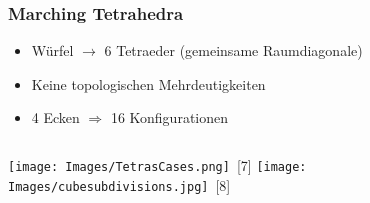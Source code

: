 \documentclass{beamer}
\begin{document}
\begin{frame}[t]
  \frametitle{Marching Tetrahedra}

  \begin{itemize}
    \item Würfel $\rightarrow$ 6 Tetraeder (gemeinsame Raumdiagonale)
    \item Keine topologischen Mehrdeutigkeiten
    \item 4 Ecken $\Rightarrow$ 16 Konfigurationen
  \end{itemize}

  \vspace{1ex}

  \hfill %
  \begin{minipage}{0.9\textwidth}
    \begin{columns}[onlytextwidth]
        \texttt{[image: Images/TetrasCases.png]}~\scriptsize[7]
      \raggedleft
        \texttt{[image: Images/cubesubdivisions.jpg]}~\scriptsize[8]
    \end{columns}
  \end{minipage}
\end{frame}

\begin{comment}
\begin{frame}[t]
  \frametitle{Marching Cubes 33}

  \begin{columns}[t]
    \begin{column}{2.7cm}
      \raisebox{4cm}[0pt][0pt]{%
        \makebox[0pt][l]{%
          \hspace*{-1.8cm}
          \begin{minipage}{6cm}
            \begin{itemize}
            \item Erweiterung auf \textbf{33} Basis-Konfigurationen
            \item Vermeidung topologischer Fehler an Zellgrenzen durch konsistente Kantentriangulierung
            \item korrekt rekonstruierte Isoflächen
            \item Einsatz des \textbf{Asymptotic Decider} zur Auflösung mehrdeutiger Fälle
            \end{itemize}
          \end{minipage}
        }
      }
    \end{column}

    \begin{column}{5cm}
      \texttt{[image: Images/MC33.png]}
      \vspace{0.3em}
    \end{column}
  \end{columns}
\end{frame}
\end{comment}
\end{document}
